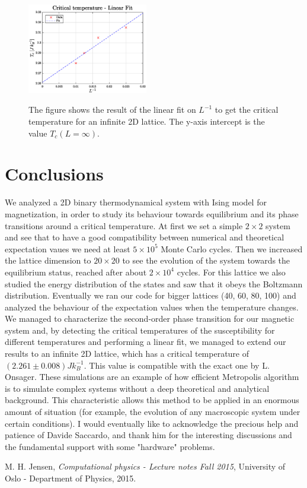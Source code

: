 \documentclass[%
 reprint,
 amsmath,amssymb,
 aps,
]{revtex4-1}
\theoremstyle{plain}
\theoremstyle{definition}
\theoremstyle{plain}
\begin{document}
\begin{figure}[ht!]
	\centering
	\includegraphics[width=0.47\textwidth]{TempFit}
	\label{LinFit}
	\caption{The figure shows the result of the linear fit on $L^{-1}$ to get the critical temperature for an infinite 2D lattice. The y-axis intercept is the value $T_c(L=\infty)$.}
\end{figure}

\section{Conclusions}
We analyzed a 2D binary thermodynamical system with Ising model for magnetization, in order to study its behaviour towards equilibrium and its phase transitions around a critical temperature.
At first we set a simple $2\times2$ system and see that to have a good compatibility between numerical and theoretical expectation vaues we need at least $5\times10^5$ Monte Carlo cycles. 
Then we increased the lattice dimension to $20\times20$ to see the evolution of the system towards the equilibrium status, reached after about $2\times10^4$ cycles. For this lattice we also studied the energy distribution of the states and saw that it obeys the Boltzmann distribution.
Eventually we ran our code for bigger lattices (40, 60, 80, 100) and analyzed the behaviour of the expectation values when the temperature changes. We managed to characterize the second-order phase transition for our magnetic system and, by detecting the critical temperatures of the susceptibility for different temperatures and performing a linear fit, we managed to extend our results to an infinite 2D lattice, which has a critical temperature of $(2.261\pm0.008)Jk_B^{-1}$. This value is compatible with the exact one by L. Onsager.
These simulations are an example of how efficient Metropolis algorithm is to simulate complex systems without a deep theoretical and analytical background. This characteristic allows this method to be applied in an enormous amount of situation (for example, the evolution of any macroscopic system under certain conditions).
I would eventually like to acknowledge the precious help and patience of Davide Saccardo, and thank him for the interesting discussions and the fundamental support with some "hardware" problems.

\begin{thebibliography}{5}

 M. H. Jensen, \textit{Computational physics - Lecture notes Fall 2015}, University of Oslo - Department of Physics, 2015. 
\end{thebibliography}
\end{document}

